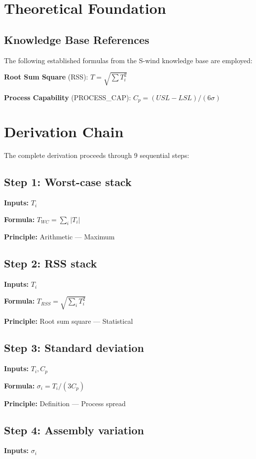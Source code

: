 \documentclass[11pt,twocolumn]{article}
\begin{document}
\section{Theoretical Foundation}

\subsection{Knowledge Base References}
The following established formulas from the S-wind knowledge base are employed:

\textbf{Root Sum Square} (RSS): $T = \sqrt{\sum T_i^2}$ \cite{Statistical Tolerance}

\textbf{Process Capability} (PROCESS_CAP): $C_p = (USL-LSL)/(6\sigma)$ \cite{Quality Engineering}


\section{Derivation Chain}

The complete derivation proceeds through 9 sequential steps:

\subsection*{Step 1: Worst-case stack}
\textbf{Inputs:} $T_i$

\textbf{Formula:} $T_{WC} = \sum_i |T_i|$

\textbf{Principle:} Arithmetic --- Maximum

\subsection*{Step 2: RSS stack}
\textbf{Inputs:} $T_i$

\textbf{Formula:} $T_{RSS} = \sqrt{\sum_i T_i^2}$

\textbf{Principle:} Root sum square --- Statistical

\subsection*{Step 3: Standard deviation}
\textbf{Inputs:} $T_i, C_p$

\textbf{Formula:} $\sigma_i = T_i/(3C_p)$

\textbf{Principle:} Definition --- Process spread

\subsection*{Step 4: Assembly variation}
\textbf{Inputs:} $\sigma_i$
\end{document}
